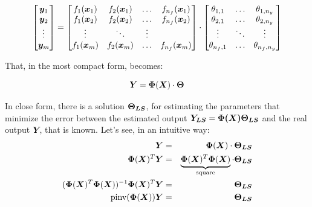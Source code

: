 \begin{equation}
    \begin{bmatrix}
        \bm{y}_1 \\
        \bm{y}_2 \\
        \vdots \\
        \bm{y}_m \\
    \end{bmatrix}
    =
    \begin{bmatrix}
        f_1(\bm{x}_1) & f_2(\bm{x}_1) & \dots & f_{n_f}(\bm{x}_1) \\
        f_1(\bm{x}_2) & f_2(\bm{x}_2) & \dots & f_{n_f}(\bm{x}_2) \\
        \vdots & \ddots & \vdots \\
        f_1(\bm{x}_m) & f_2(\bm{x}_m) & \dots & f_{n_f}(\bm{x}_m) \\
    \end{bmatrix}
    \cdot
    \begin{bmatrix}
        \theta_{1,1}  & \dots & \theta_{1,n_y} \\
        \theta_{2,1}  & \dots & \theta_{2,n_y} \\
        \vdots & \ddots & \vdots \\
        \theta_{n_f,1}  & \dots & \theta_{n_f,n_y} \\
    \end{bmatrix}
\end{equation}

That, in the most compact form, becomes:

\begin{equation}
    \bm{Y} = \bm{\Phi}(\bm{X}) \cdot \bm{\Theta}
\end{equation}

In close form, there is a solution $\bm{\Theta_{LS}}$, for estimating the parameters that minimize the error between the estimated output $\bm{Y_{LS}} = \bm{\Phi(\bm{X})}\bm{\Theta_{LS}}$ and the real output $\bm{Y_{}}$, that is known. Let's see, in an intuitive way:
\begin{eqnarray}
    \bm{Y} &=& \bm{\Phi}(\bm{X}) \cdot \bm{\Theta_{LS}} \\
    \bm{\Phi}(\bm{X})^T\bm{Y} &=& \underbrace{\bm{\Phi}(\bm{X})^T\bm{\Phi}(\bm{X})}_{\text{square}}\cdot \bm{\Theta_{LS}}\\
    (\bm{\Phi}(\bm{X})^T\bm{\Phi}(\bm{X}))^{-1}\bm{\Phi}(\bm{X})^T\bm{Y} &=& \bm{\Theta_{LS}}\\
    \text{pinv}(\bm{\Phi}(\bm{X}))\bm{Y} &=& \bm{\Theta_{LS}} \label{eq:LS}
\end{eqnarray}

